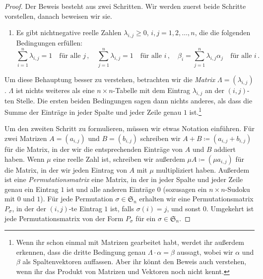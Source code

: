 \begin{proof}
	Der Beweis besteht aus zwei Schritten. Wir werden zuerst beide Schritte vorstellen, danach beweisen wir sie.
	\begin{enumerate}[label=\textup{(\arabic*)},ref=\textup{(\arabic*)}]\itshape
		\item Es gibt nichtnegative reelle Zahlen $\lambda_{i,j}\geqslant 0$, $i,j=1,2,\dotsc,n$, die die folgenden Bedingungen erfüllen:\label{behauptung:DoppeltStochastischeMatrix}
		\begin{equation*}
			\sum_{i=1}^n\lambda_{i,j}=1\quad\text{für alle $j$}\,,\quad \sum_{j=1}^n\lambda_{i,j}=1\quad\text{für alle $i$}\,,\quad \beta_i=\sum_{j=1}^n\lambda_{i,j}\alpha_j\quad\text{für alle $i$}\,.
		\end{equation*}
	\end{enumerate}
	Um diese Behauptung besser zu verstehen, betrachten wir die \emph{Matrix} $\Lambda=(\lambda_{i,j})$. $\Lambda$ ist nichts weiteres als eine $n\times n$-Tabelle mit dem Eintrag $\lambda_{i,j}$ an der $(i,j)$-ten Stelle. Die ersten beiden Bedingungen sagen dann nichts anderes, als dass die Summe der Einträge in jeder Spalte und jeder Zeile genau $1$ ist.\footnote{Wenn ihr schon einmal mit Matrizen gearbeitet habt, werdet ihr außerdem erkennen, dass die dritte Bedingung genau $\Lambda\cdot\alpha=\beta$ aussagt, wobei wir $\alpha$ und $\beta$ als Spaltenvektoren auffassen. Aber ihr könnt den Beweis auch verstehen, wenn ihr das Produkt von Matrizen und Vektoren noch nicht kennt.}
	
	Um den zweiten Schritt zu formulieren, müssen wir etwas Notation einführen. Für zwei Matrizen $A=(a_{i,j})$ und $B=(b_{i,j})$ schreiben wir $A+B\coloneqq (a_{i,j}+b_{i,j})$ für die Matrix, in der wir die entsprechenden Einträge von $A$ und $B$ addiert haben. Wenn $\mu$ eine reelle Zahl ist, schreiben wir außerdem $\mu A\coloneqq (\mu a_{i,j})$ für die Matrix, in der wir jeden Eintrag von $A$ mit $\mu$ multipliziert haben. Außerdem ist eine \emph{Permutationsmatrix} eine Matrix, in der in jeder Spalte und jeder Zeile genau ein Eintrag $1$ ist und alle anderen Einträge $0$ (sozusagen ein \glqq $n\times n$-Sudoku mit $0$ und $1$\grqq). Für jede Permutation $\sigma\in\mathfrak S_n$ erhalten wir eine Permutationsmatrix $P_\sigma$, in der der $(i,j)$-te Eintrag $1$ ist, falls $\sigma(i)=j$, und sonst $0$. Umgekehrt ist jede Permutationsmatrix von der Form $P_\sigma$ für ein $\sigma\in\mathfrak S_n$.
	

\end{proof}
